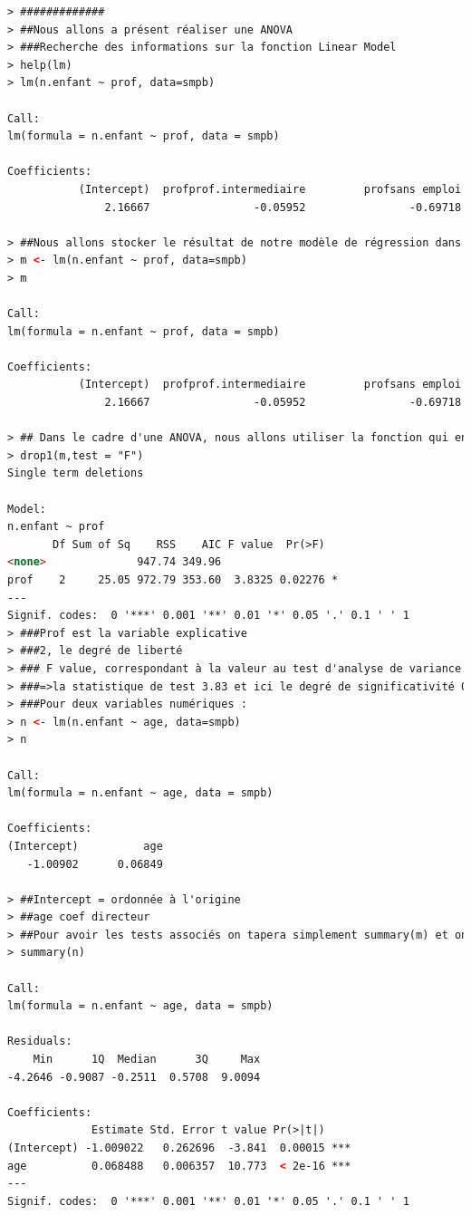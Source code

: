 \begin{lstlisting}[language=html]
> #############
> ##Nous allons a présent réaliser une ANOVA
> ###Recherche des informations sur la fonction Linear Model
> help(lm)
> lm(n.enfant ~ prof, data=smpb)

Call:
lm(formula = n.enfant ~ prof, data = smpb)

Coefficients:
           (Intercept)  profprof.intermediaire         profsans emploi  
               2.16667                -0.05952                -0.69718  

> ##Nous allons stocker le résultat de notre modèle de régression dans la variable m :
> m <- lm(n.enfant ~ prof, data=smpb)
> m

Call:
lm(formula = n.enfant ~ prof, data = smpb)

Coefficients:
           (Intercept)  profprof.intermediaire         profsans emploi  
               2.16667                -0.05952                -0.69718  

> ## Dans le cadre d'une ANOVA, nous allons utiliser la fonction qui en donnant le nom d'une variable et en spécifiant un test de Fisher Snedecor, de fournir un tableau d'analyse de variance,
> drop1(m,test = "F")
Single term deletions

Model:
n.enfant ~ prof
       Df Sum of Sq    RSS    AIC F value  Pr(>F)  
<none>              947.74 349.96                  
prof    2     25.05 972.79 353.60  3.8325 0.02276 *
---
Signif. codes:  0 '***' 0.001 '**' 0.01 '*' 0.05 '.' 0.1 ' ' 1
> ###Prof est la variable explicative
> ###2, le degré de liberté
> ### F value, correspondant à la valeur au test d'analyse de variance.
> ###=>la statistique de test 3.83 et ici le degré de significativité 0.02.
> ###Pour deux variables numériques :
> n <- lm(n.enfant ~ age, data=smpb)
> n

Call:
lm(formula = n.enfant ~ age, data = smpb)

Coefficients:
(Intercept)          age  
   -1.00902      0.06849  

> ##Intercept = ordonnée à l'origine
> ##age coef directeur
> ##Pour avoir les tests associés on tapera simplement summary(m) et on aura un tableau avec les coefficients de régression et les tests t associés ici pour la pente 10.77 et le degré de significativité.
> summary(n)

Call:
lm(formula = n.enfant ~ age, data = smpb)

Residuals:
    Min      1Q  Median      3Q     Max 
-4.2646 -0.9087 -0.2511  0.5708  9.0094 

Coefficients:
             Estimate Std. Error t value Pr(>|t|)    
(Intercept) -1.009022   0.262696  -3.841  0.00015 ***
age          0.068488   0.006357  10.773  < 2e-16 ***
---
Signif. codes:  0 '***' 0.001 '**' 0.01 '*' 0.05 '.' 0.1 ' ' 1


\end{lstlisting}
